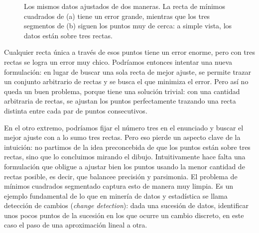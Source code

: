 \documentclass[12pt, spanish, oneside, openany]{book}
\theoremstyle{uprightplain}
\theoremstyle{definition}
\theoremstyle{remark}
\theoremstyle{definition}
\begin{document}
\begin{figure}[H]
\centering
{}
\caption{Los mismos datos ajustados de dos maneras. La recta de mínimos
cuadrados de (a) tiene un error grande, mientras que los tres segmentos de (b)
siguen los puntos muy de cerca: a simple vista, los datos están sobre tres
rectas.}
\label{fig:dp-mcs-motivacion}
\end{figure}

Cualquier recta única a través de esos puntos tiene un error enorme, pero con tres rectas se logra un error muy chico. Podríamos entonces intentar una nueva formulación: en lugar de buscar una sola recta de mejor ajuste, se permite trazar un conjunto arbitrario de rectas y se busca el que minimiza el error. Pero así no queda un buen problema, porque tiene una solución trivial: con una cantidad arbitraria de rectas, se ajustan los puntos perfectamente trazando una recta distinta entre cada par de puntos consecutivos.

En el otro extremo, podríamos fijar el número tres en el enunciado y buscar el mejor ajuste con a lo sumo tres rectas. Pero eso pierde un aspecto clave de la intuición: no partimos de la idea preconcebida de que los puntos están sobre tres rectas, sino que lo concluimos mirando el dibujo. Intuitivamente hace falta una formulación que obligue a ajustar bien los puntos usando la menor cantidad de rectas posible, es decir, que balancee precisión y parsimonia. El problema de mínimos cuadrados segmentado captura esto de manera muy limpia. Es un ejemplo fundamental de lo que en minería de datos y estadística se llama detección de cambios (\emph{change detection}): dada una sucesión de datos, identificar unos pocos puntos de la sucesión en los que ocurre un cambio discreto, en este caso el paso de una aproximación lineal a otra.
\end{document}
